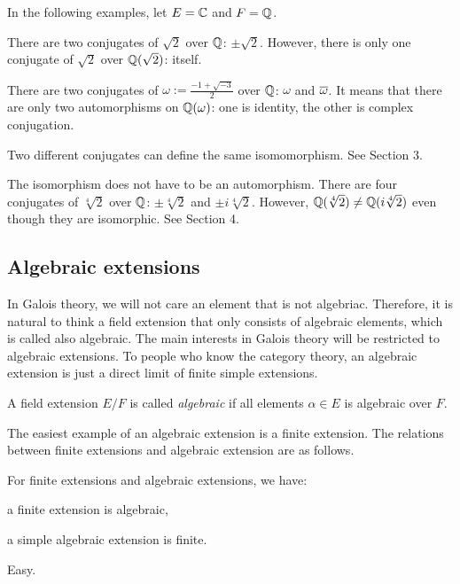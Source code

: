 \documentclass{../exp}
\begin{document}
In the following examples, let $E=\mathbb{C}$ and $F=\mathbb{Q}$.
\begin{ex}
There are two conjugates of $\sqrt2$ over $\mathbb{Q}$: $\pm\sqrt2$.
However, there is only one conjugate of $\sqrt2$ over $\mathbb{Q}(\sqrt2)$: itself.
\end{ex}
\begin{ex}
There are two conjugates of $\omega:=\frac{-1+\sqrt{-3}}2$ over $\mathbb{Q}$: $\omega$ and $\overline\omega$.
It means that there are only two automorphisms on $\mathbb{Q}(\omega)$: one is identity, the other is complex conjugation.
\end{ex}
\begin{ex}
Two different conjugates can define the same isomomorphism.
See Section 3.
\end{ex}
\begin{ex}
The isomorphism does not have to be an automorphism.
There are four conjugates of $\sqrt[4]2$ over $\mathbb{Q}$: $\pm\sqrt[4]2$ and $\pm i\sqrt[4]2$.
However, $\mathbb{Q}(\sqrt[4]2)\ne\mathbb{Q}(i\sqrt[4]2)$ even though they are isomorphic.
See Section 4.
\end{ex}



\subsection{Algebraic extensions}

In Galois theory, we will not care an element that is not algebriac.
Therefore, it is natural to think a field extension that only consists of algebraic elements, which is called also algebraic.
The main interests in Galois theory will be restricted to algebraic extensions.
To people who know the category theory, an algebraic extension is just a direct limit of finite simple extensions.

\begin{defn}
A field extension $E/F$ is called \emph{algebraic} if all elements $\alpha\in E$ is algebraic over $F$.
\end{defn}

The easiest example of an algebraic extension is a finite extension.
The relations between finite extensions and algebraic extension are as follows.

\begin{thm}
For finite extensions and algebraic extensions, we have:
\begin{cond}
\item a finite extension is algebraic,
\item a simple algebraic extension is finite.
\end{cond}
\end{thm}
\begin{pf} Easy. \end{pf}
\end{document}
